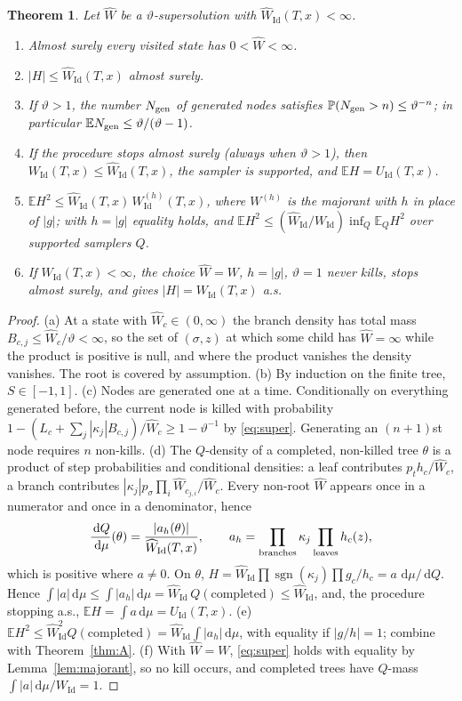 \documentclass[11pt]{article}
\newtheorem{theorem}{Theorem}[section]
\theoremstyle{definition}
\theoremstyle{remark}
\newcommand{\E}{\mathbb{E}}
\renewcommand{\P}{\mathbb{P}}
\newcommand{\Id}{\mathrm{Id}}
\newcommand{\dd}{\,\mathrm{d}}
\newcommand{\sgn}{\operatorname{sgn}}
\newcommand{\Wh}{\widehat W}
\begin{document}
\begin{theorem}\label{thm:B}
Let $\Wh$ be a $\vartheta$-supersolution with $\Wh_\Id(T,x)<\infty$.
\begin{enumerate}[label=(\alph*),leftmargin=*]
\item Almost surely every visited state has $0<\Wh<\infty$.
\item $|H|\le\Wh_\Id(T,x)$ almost surely.
\item If $\vartheta>1$, the number $N_{\rm gen}$ of generated nodes satisfies
$\P(N_{\rm gen}>n)\le\vartheta^{-n}$; in particular
$\E N_{\rm gen}\le\vartheta/(\vartheta-1)$.
\item If the procedure stops almost surely (always when $\vartheta>1$), then
$W_\Id(T,x)\le\Wh_\Id(T,x)$, the sampler is supported, and $\E H=U_\Id(T,x)$.
\item $\E H^2\le\Wh_\Id(T,x)\,W^{(h)}_\Id(T,x)$, where $W^{(h)}$ is the
majorant with $h$ in place of $|g|$; with $h=|g|$ equality holds, and
$\E H^2\le(\Wh_\Id/W_\Id)\inf_Q\E_QH^2$ over supported samplers $Q$.
\item If $W_\Id(T,x)<\infty$, the choice $\Wh=W$, $h=|g|$, $\vartheta=1$
never kills, stops almost surely, and gives $|H|=W_\Id(T,x)$ a.s.
\end{enumerate}
\end{theorem}

\begin{proof}
(a) At a state with $\Wh_c\in(0,\infty)$ the branch density has total mass
$B_{c,j}\le\Wh_c/\vartheta<\infty$, so the set of $(\sigma,z)$ at which
some child has $\Wh=\infty$ while the product is positive is null, and
where the product vanishes the density vanishes. The root is covered by
assumption.
(b) By induction on the finite tree, $S\in[-1,1]$.
(c) Nodes are generated one at a time. Conditionally on everything
generated before, the current node is killed with probability
$1-(L_c+\sum_j|\kappa_j|B_{c,j})/\Wh_c\ge1-\vartheta^{-1}$ by
\eqref{eq:super}. Generating an $(n+1)$st node requires $n$ non-kills.
(d) The $Q$-density of a completed, non-killed tree $\theta$ is a
product of step probabilities and conditional densities: a leaf
contributes $p_th_c/\Wh_c$, a branch contributes
$|\kappa_j|p_\sigma\prod_i\Wh_{c_{j,i}}/\Wh_c$. Every non-root $\Wh$
appears once in a numerator and once in a denominator, hence
\[
\frac{\dd Q}{\dd\mu}(\theta)=\frac{|a_h(\theta)|}{\Wh_\Id(T,x)},\qquad
a_h=\prod_{\rm branches}\kappa_j\prod_{\rm leaves}h_c(z),
\]
which is positive where $a\ne0$. On $\theta$,
$H=\Wh_\Id\prod\sgn(\kappa_j)\prod g_c/h_c=a\,\dd\mu/\dd Q$. Hence
$\int|a|\dd\mu\le\int|a_h|\dd\mu=\Wh_\Id\,Q(\text{completed})\le\Wh_\Id$,
and, the procedure stopping a.s., $\E H=\int a\dd\mu=U_\Id(T,x)$.
(e) $\E H^2\le\Wh_\Id^2Q(\text{completed})=\Wh_\Id\int|a_h|\dd\mu$, with
equality if $|g/h|=1$; combine with Theorem~\ref{thm:A}.
(f) With $\Wh=W$, \eqref{eq:super} holds with equality by
Lemma~\ref{lem:majorant}, so no kill occurs, and completed trees have
$Q$-mass $\int|a|\dd\mu/W_\Id=1$.
\end{proof}
\end{document}
